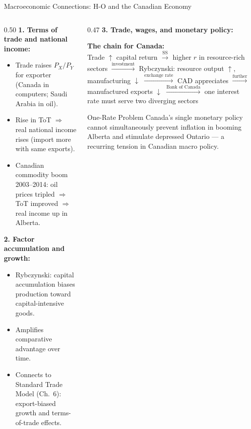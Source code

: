 \documentclass[aspectratio=169]{beamer}
\begin{document}
\begin{frame}[shrink=15]{Macroeconomic Connections: H-O and the Canadian Economy}
\begin{columns}[T]
\begin{column}{0.50\textwidth}
\textbf{1. Terms of trade and national income:}
\begin{itemize}\small
  \item Trade raises $P_X/P_Y$ for exporter (Canada
        in computers; Saudi Arabia in oil).
  \item Rise in ToT $\Rightarrow$ real national
        income rises (import more with same exports).
  \item Canadian commodity boom 2003--2014: oil
        prices tripled $\Rightarrow$ ToT improved
        $\Rightarrow$ real income up in Alberta.
\end{itemize}
\vspace{0.3em}
\textbf{2. Factor accumulation and growth:}
\begin{itemize}\small
  \item Rybczynski: capital accumulation biases
        production toward capital-intensive goods.
  \item Amplifies comparative advantage over time.
  \item Connects to Standard Trade Model (Ch.~6):
        export-biased growth and terms-of-trade
        effects.
\end{itemize}
\end{column}
\begin{column}{0.47\textwidth}
\textbf{3. Trade, wages, and monetary policy:}
\begin{varbox}
\small\textbf{The chain for Canada:}\\[0.2em]
Trade $\uparrow$ capital return
$\xrightarrow{\text{SS}}$
higher $r$ in resource-rich sectors
$\xrightarrow{\text{investment}}$
Rybczynski: resource output $\uparrow$,
manufacturing $\downarrow$
$\xrightarrow{\text{exchange rate}}$
CAD appreciates
$\xrightarrow{\text{further}}$
manufactured exports $\downarrow$
$\xrightarrow{\text{Bank of Canada}}$
one interest rate must serve two
diverging sectors
\end{varbox}
\vspace{0.3em}
\begin{insight}{One-Rate Problem}
\small Canada's single monetary policy cannot
simultaneously prevent inflation in booming
Alberta and stimulate depressed Ontario ---
a recurring tension in Canadian macro policy.
\end{insight}
\end{column}
\end{columns}
\end{frame}
\end{document}
